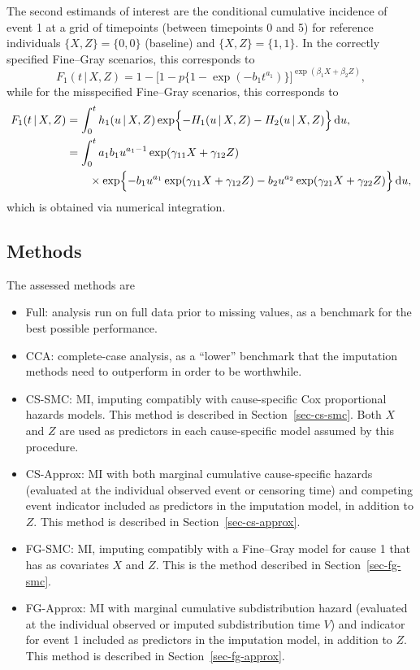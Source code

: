 \documentclass[
  letterpaper,
  paper=240mm:170mm,
  twoside=true,
  open=right,
  fontsize=10pt,
  pagesize=false,
  BCOR=15mm,
  DIV=14,
  headinclude=true,
  footinclude=false,
  headsepline=on]{scrbook}
\providecommand{\tightlist}{%
  \setlength{\itemsep}{0pt}\setlength{\parskip}{0pt}}\usepackage{longtable,booktabs,array}
\newcommand{\given}{\,|\,}
\newcommand\diff{\mathop{}\!\mathrm{d}}
\begin{document}
The second estimands of interest are the conditional cumulative
incidence of event 1 at a grid of timepoints (between timepoints 0 and
5) for reference individuals \(\{X, Z\} = \{0,0\}\) (baseline) and
\(\{X, Z\} = \{1,1\}\). In the correctly specified Fine--Gray scenarios,
this corresponds to \begin{equation*}
    F_1(t \given X, Z) = 1 - \big[1-p\{1- \exp(-b_1t^{a_1})\}\big]^{\exp(\beta_{1}X + \beta_{2}Z)},
\end{equation*} while for the misspecified Fine--Gray scenarios, this
corresponds to \begin{align*}
    F_1(t \given X, Z) &= \int_{0}^{t}h_1(u \given X, Z) \exp\Bigl\{{ - H_1(u \given X, Z) - H_2(u \given X, Z) \Bigr\}}\diff u, \\
    &= \int_{0}^{t} a_1b_1u^{a_1 - 1}\exp(\gamma_{11}X + \gamma_{12}Z) \\
    &\qquad \times  \exp\Bigl\{{ -b_1u^{a_1}\exp(\gamma_{11}X + \gamma_{12}Z) - b_2u^{a_2}\exp(\gamma_{21}X + \gamma_{22}Z) \Bigr\}}\diff u,
\end{align*} which is obtained via numerical integration.

\subsection{Methods}\label{methods-1}

The assessed methods are

\begin{itemize}
\tightlist
\item
  Full: analysis run on full data prior to missing values, as a
  benchmark for the best possible performance.
\item
  CCA: complete-case analysis, as a ``lower'' benchmark that the
  imputation methods need to outperform in order to be worthwhile.
\item
  CS-SMC: MI, imputing compatibly with cause-specific Cox proportional
  hazards models. This method is described in Section~\ref{sec-cs-smc}.
  Both \(X\) and \(Z\) are used as predictors in each cause-specific
  model assumed by this procedure.
\item
  CS-Approx: MI with both marginal cumulative cause-specific hazards
  (evaluated at the individual observed event or censoring time) and
  competing event indicator included as predictors in the imputation
  model, in addition to \(Z\). This method is described in
  Section~\ref{sec-cs-approx}.
\item
  FG-SMC: MI, imputing compatibly with a Fine--Gray model for cause 1
  that has as covariates \(X\) and \(Z\). This is the method described
  in Section~\ref{sec-fg-smc}.
\item
  FG-Approx: MI with marginal cumulative subdistribution hazard
  (evaluated at the individual observed or imputed subdistribution time
  \(V\)) and indicator for event 1 included as predictors in the
  imputation model, in addition to \(Z\). This method is described in
  Section~\ref{sec-fg-approx}.
\end{itemize}
\end{document}
